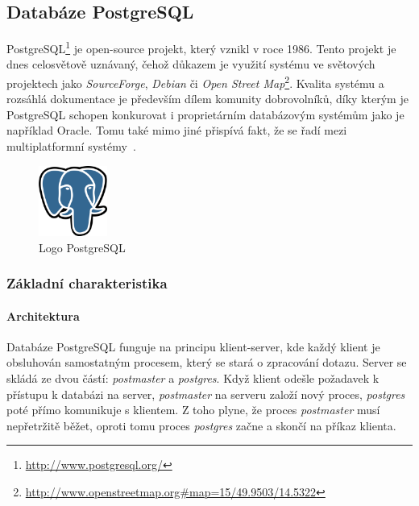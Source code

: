 \documentclass[a4paper,12pt,oneside]{report}
\begin{document}
\subsection{Databáze PostgreSQL}
PostgreSQL\footnote{\url{http://www.postgresql.org/}} je open-source
projekt, který vznikl v roce 1986. Tento projekt je dnes celosvětově
uznávaný, čehož důkazem je využití systému ve světových projektech
jako \textit{SourceForge}, %
\textit{Debian} či %
\textit{Open
  Street
  Map}\footnote{\url{http://www.openstreetmap.org\#map=15/49.9503/14.5322}}. Kvalita
systému a rozsáhlá dokumentace je především dílem komunity
dobrovolníků, díky kterým je PostgreSQL schopen konkurovat i
proprietárním databázovým systémům jako je například Oracle. Tomu také mimo jiné přispívá fakt,
že se řadí mezi multiplatformní systémy~\cite{postgre}.

\begin{figure}[h!]
    \centering
    \includegraphics[width=0.2\textwidth]{./img/implementace/postgresql.png}
    \caption[Logo PostgreSQL]{\centering Logo PostgreSQL }
 \end{figure}   


\subsubsection{Základní charakteristika}
\paragraph*{Architektura}
Databáze PostgreSQL funguje na principu klient-server, kde každý
klient je obsluhován samostatným procesem, který se stará o zpracování
dotazu. Server se skládá ze dvou částí: \textit{postmaster} a
\textit{postgres}.  Když klient odešle požadavek k přístupu k databázi
na server, \textit{postmaster} na serveru založí nový proces, 
\textit{postgres} poté přímo komunikuje s klientem. Z toho plyne, že
proces \textit{postmaster} musí nepřetržitě běžet, oproti tomu proces
\textit{postgres} začne a skončí na příkaz klienta.
\end{document}
